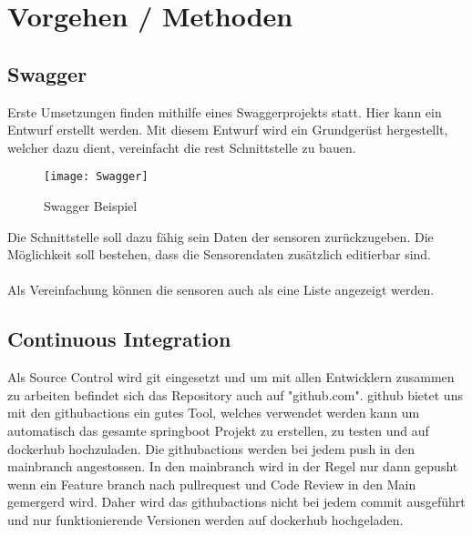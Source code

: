 \documentclass[../main.tex]{subfiles}
\begin{document}
	\section{Vorgehen / Methoden}
	
	\subsection{Swagger}
	Erste Umsetzungen finden mithilfe eines Swaggerprojekts statt. Hier kann ein Entwurf erstellt werden. Mit diesem Entwurf wird ein Grundgerüst hergestellt, welcher dazu dient, vereinfacht die \gls{rest} Schnittstelle zu bauen.
	
	\begin{figure}[H]
		\centering
		\texttt{[image: Swagger]}
		\caption{Swagger Beispiel}
		\label{fig:Swagger}
	\end{figure}
	\par
	\noindent
	Die Schnittstelle soll dazu fähig sein Daten der \gls{sensor}en zurückzugeben. Die Möglichkeit soll bestehen, dass die Sensorendaten zusätzlich editierbar sind.\\
	\\
	Als Vereinfachung können die \gls{sensor}en auch als eine Liste angezeigt werden.
	
	\subsection{Continuous Integration}
	Als Source Control wird \gls{git} eingesetzt und um mit allen Entwicklern zusammen zu arbeiten befindet sich das Repository auch auf "github.com". \gls{github} bietet uns mit den \gls{githubactions} ein gutes Tool, welches verwendet werden kann um automatisch das gesamte \gls{springboot} Projekt zu erstellen, zu testen und auf \gls{dockerhub} hochzuladen. Die \gls{githubactions} werden bei jedem \gls{push} in den \gls{mainbranch} angestossen. In den \gls{mainbranch} wird in der Regel nur dann gepusht wenn ein Feature \gls{branch} nach \gls{pullrequest} und Code Review in den Main gemergerd wird. Daher wird das \gls{githubactions} nicht bei jedem \gls{commit} ausgeführt und nur funktionierende Versionen werden auf \gls{dockerhub} hochgeladen.
	
\end{document}

